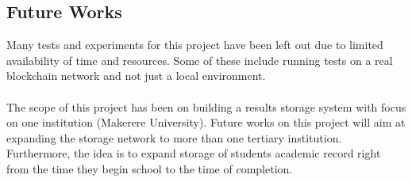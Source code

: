 \subsection{Future Works}
Many tests and experiments for this project have been left out due to limited availability of time and resources. Some of these include running tests on a real blockchain network and not just a local environment. \\\\
The scope of this project has been on building a results storage system with focus on one institution (Makerere University). Future works on this project will aim at expanding the storage network to more than one tertiary institution. Furthermore, the idea is to expand storage of students academic record right from the time they begin school to the time of completion.
